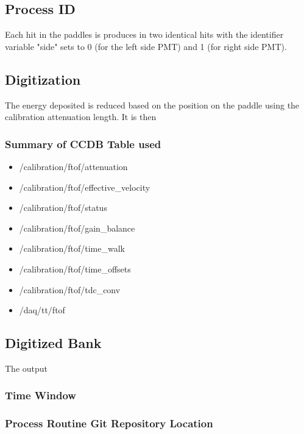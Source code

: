\subsection{Process ID}
Each hit in the paddles is produces in two identical hits with the identifier variable "side" sets to 0 (for the left side PMT) and 1 (for right side PMT).

\subsection{Digitization}

The energy deposited is reduced based on the position on the paddle using the calibration attenuation length. It is then

\subsubsection{Summary of CCDB Table used}
\begin{itemize}
	\item /calibration/ftof/attenuation
	\item /calibration/ftof/effective\_velocity
	\item /calibration/ftof/status
	\item /calibration/ftof/gain\_balance
	\item /calibration/ftof/time\_walk
	\item /calibration/ftof/time\_offsets
	\item /calibration/ftof/tdc\_conv
	\item /daq/tt/ftof
\end{itemize}

\subsection{Digitized Bank}
The output



\subsubsection{Time Window}

\subsubsection{Process Routine Git Repository Location}


